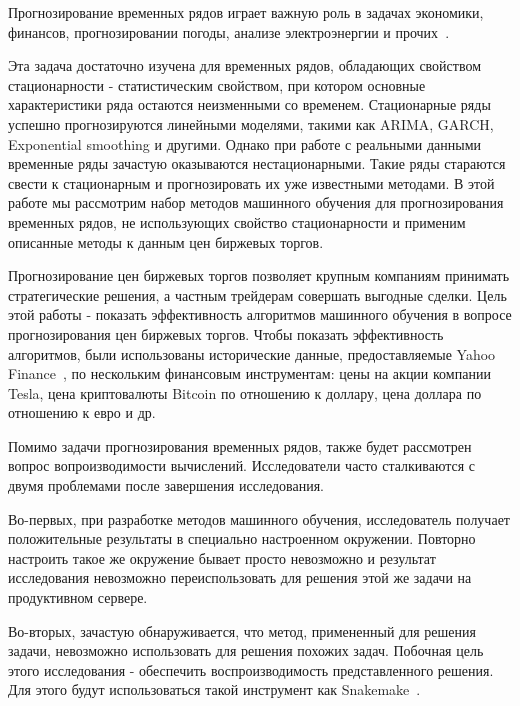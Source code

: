 \documentclass[a4paper,article,14pt]{extarticle}
\begin{document}


\tableofcontents

\pagebreak
{}

Прогнозирование временных рядов играет важную роль в задачах экономики, финансов, прогнозировании погоды, анализе электроэнергии и прочих~\cite{ts25}.

Эта задача достаточно изучена для временных рядов, обладающих свойством стационарности - статистическим свойством, при котором основные характеристики ряда остаются неизменными со временем.
Стационарные ряды успешно прогнозируются линейными моделями, такими как ARIMA, GARCH, Exponential smoothing и другими.
Однако при работе с реальными данными временные ряды зачастую оказываются нестационарными.
Такие ряды стараются свести к стационарным и прогнозировать их уже известными методами.
В этой работе мы рассмотрим набор методов машинного обучения для прогнозирования временных рядов, не использующих свойство стационарности и применим описанные методы к данным цен биржевых торгов.
\par

Прогнозирование цен биржевых торгов позволяет крупным компаниям принимать стратегические решения, а частным трейдерам совершать выгодные сделки.
Цель этой работы - показать эффективность алгоритмов машинного обучения в вопросе прогнозирования цен биржевых торгов.
Чтобы показать эффективность алгоритмов, были использованы исторические данные, предоставляемые Yahoo Finance~\cite{yahoo},
по нескольким финансовым инструментам: цены на акции компании Tesla,
цена криптовалюты Bitcoin по отношению к доллару, цена доллара по отношению к евро и др. %
\par

Помимо задачи прогнозирования временных рядов, также будет рассмотрен вопрос вопроизводимости вычислений.
Исследователи часто сталкиваются с двумя проблемами после завершения исследования.
\par
Во-первых, при разработке методов машинного обучения, исследователь получает положительные результаты в специально настроенном окружении.
Повторно настроить такое же окружение бывает просто невозможно и результат исследования невозможно переиспользовать для решения этой же задачи на продуктивном сервере.
\par
Во-вторых, зачастую обнаруживается, что метод, примененный для решения задачи, невозможно использовать для решения похожих задач.
Побочная цель этого исследования - обеспечить воспроизводимость представленного решения.
Для этого будут использоваться такой инструмент как Snakemake~\cite{snakemake}.
\end{document}
